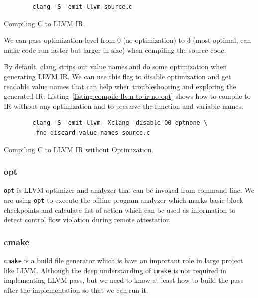 \begin{listing}[htbp]
    \begin{verbatim}
        clang -S -emit-llvm source.c
    \end{verbatim}
    \caption{Compiling C to LLVM IR.}    
    \label{listing:compile-llvm-to-ir}
\end{listing}
    
We can pass optimization level from 0 (no-optimization) to 3 (most optimal, can
make code run faster but larger in size) when compiling the source code.

By default, clang strips out value names and do some optimization when
generating LLVM IR. We can use this flag to disable optimization and get
readable value names that can help when troubleshooting and exploring the
generated IR. Listing~\ref{listing:compile-llvm-to-ir-no-opt} shows how to
compile to IR without any optimization and to preserve the function and variable
names.

\begin{listing}[htbp]
    \begin{verbatim}
        clang -S -emit-llvm -Xclang -disable-O0-optnone \
        -fno-discard-value-names source.c
    \end{verbatim}
    \caption{Compiling C to LLVM IR without Optimization.}    
    \label{listing:compile-llvm-to-ir-no-opt}
\end{listing}

\subsubsection{opt}

\texttt{opt} is LLVM optimizer and analyzer that can be invoked from command
line. We are using \texttt{opt} to execute the offline program analyzer which
marks basic block checkpoints and calculate list of action which can be used as
information to detect control flow violation during remote attestation.

\subsubsection{cmake}

\texttt{cmake} is a build file generator which is have an important role in
large project like LLVM. Although the deep understanding of \texttt{cmake} is
not required in implementing LLVM pass, but we need to know at least how to
build the pass after the implementation so that we can run it.

